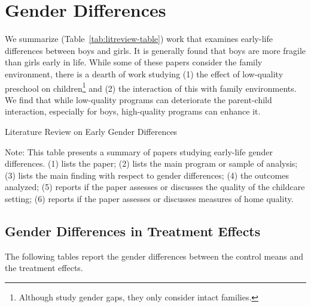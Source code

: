 \section{Gender Differences}
\label{appendix:genderdifferences}

We summarize (Table~\ref{tab:litreview-table}) work that examines early-life differences between boys and girls. It is generally found that boys are more fragile than girls early in life. While some of these papers consider the family environment, there is a dearth of work studying (1) the effect of low-quality preschool on children\footnote{Although \citet{Kottelenberg-Lehrer_2014_Gender-Effects} study gender gaps, they only consider intact families.} and (2) the interaction of this with family environments. We find that while low-quality programs can deteriorate the parent-child interaction, especially for boys, high-quality programs can enhance it.

\begin{table}
\centering
\caption{Literature Review on Early Gender Differences}
\label{tab:litreview-table}
\begin{adjustbox}{width=1.05\textwidth}
\begin{threeparttable}

\begin{tablenotes}
\Large
\item Note: This table presents a summary of papers studying early-life gender differences. (1) lists the paper; (2) lists the main program or sample of analysis; (3) lists the main finding with respect to gender differences; (4) the outcomes analyzed; (5) reports if the paper assesses or discusses the quality of the childcare setting; (6) reports if the paper assesses or discusses measures of home quality.
\end{tablenotes}
\end{threeparttable}
\end{adjustbox}
\end{table} 

\subsection{Gender Differences in Treatment Effects}
\label{appendix:gdiff-tes}
The following tables report the gender differences between the control means and the treatment effects.

